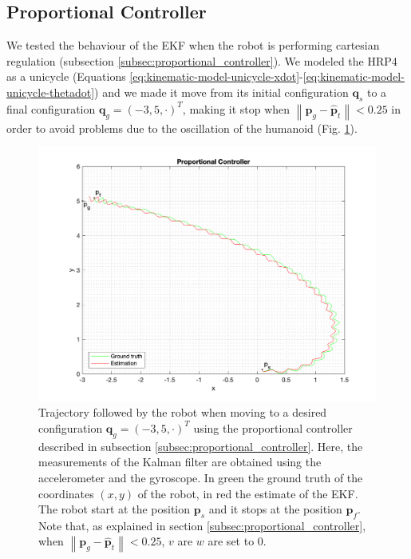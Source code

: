 \documentclass[a4paper]{article}
\begin{document}
\subsection{Proportional Controller}
We tested the behaviour of the EKF when the robot is
performing cartesian regulation (subsection \ref{subsec:proportional_controller}).
We modeled the HRP4 as a unicycle (Equations
\ref{eq:kinematic-model-unicycle-xdot}-\ref{eq:kinematic-model-unicycle-thetadot})
and we made it move from its initial
configuration $\bm{q}_s$ to a final configuration $\bm{q}_g = (-3, 5, \cdot)^T$,
making it stop when $\left\|\bm{p}_g - \bm{\hat{p}}_t \right\| < 0.25$
in order to avoid problems due to
the oscillation of the humanoid (Fig. \ref{fig:proportional_controller_xy}).
\begin{figure}
    \centering
    \includegraphics[width=\textwidth]{images/proportional_controller.png}
    \caption{Trajectory followed by the robot when moving to a desired configuration
        $\bm{q}_g = (-3, 5, \cdot)^T$ using the proportional controller
        described in subsection \ref{subsec:proportional_controller}.
        Here, the measurements of the Kalman filter are obtained
        using the accelerometer and the gyroscope. In green the ground truth of the coordinates $(x, y)$ of the
        robot, in red the estimate of the EKF. The robot start at the
        position $\bm{p}_s$ and it stops at the position $\bm{p}_f$. Note that,
        as explained in section \ref{subsec:proportional_controller},
        when $\left\|\bm{p}_g - \bm{\hat{p}}_t \right\| < 0.25$, $v$ are $w$ are set to 0.}
    \label{fig:proportional_controller_xy}
\end{figure}
\end{document}
